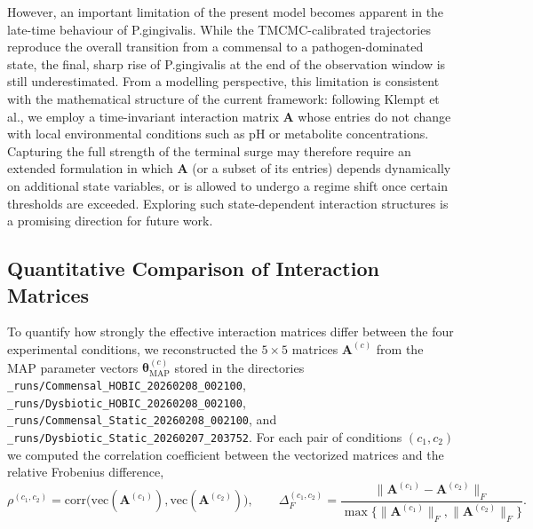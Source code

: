 \documentclass[11pt,a4paper]{article}
\begin{document}
However, an important limitation of the present model becomes apparent in the late-time behaviour of P.gingivalis. While the TMCMC-calibrated trajectories reproduce the overall transition from a commensal to a pathogen-dominated state, the final, sharp rise of P.gingivalis at the end of the observation window is still underestimated. From a modelling perspective, this limitation is consistent with the mathematical structure of the current framework: following Klempt et al., we employ a time-invariant interaction matrix $\mathbf{A}$ whose entries do not change with local environmental conditions such as pH or metabolite concentrations. Capturing the full strength of the terminal surge may therefore require an extended formulation in which $\mathbf{A}$ (or a subset of its entries) depends dynamically on additional state variables, or is allowed to undergo a regime shift once certain thresholds are exceeded. Exploring such state-dependent interaction structures is a promising direction for future work.

\subsection{Quantitative Comparison of Interaction Matrices}
To quantify how strongly the effective interaction matrices differ between the four experimental conditions, we reconstructed the $5 \times 5$ matrices $\mathbf{A}^{(c)}$ from the MAP parameter vectors $\boldsymbol{\theta}^{(c)}_{\text{MAP}}$ stored in the directories \texttt{\_runs/Commensal\_HOBIC\_20260208\_002100}, \texttt{\_runs/Dysbiotic\_HOBIC\_20260208\_002100}, \texttt{\_runs/Commensal\_Static\_20260208\_002100}, and \texttt{\_runs/Dysbiotic\_Static\_20260207\_203752}. For each pair of conditions $(c_1, c_2)$ we computed the correlation coefficient between the vectorized matrices and the relative Frobenius difference,
\begin{equation}
  \rho^{(c_1,c_2)} = \mathrm{corr}\big(\mathrm{vec}(\mathbf{A}^{(c_1)}), \mathrm{vec}(\mathbf{A}^{(c_2)})\big), \qquad
  \Delta_F^{(c_1,c_2)} = \frac{\lVert \mathbf{A}^{(c_1)} - \mathbf{A}^{(c_2)} \rVert_F}{\max\{\lVert \mathbf{A}^{(c_1)} \rVert_F, \lVert \mathbf{A}^{(c_2)} \rVert_F\}}.
\end{equation}
\end{document}
